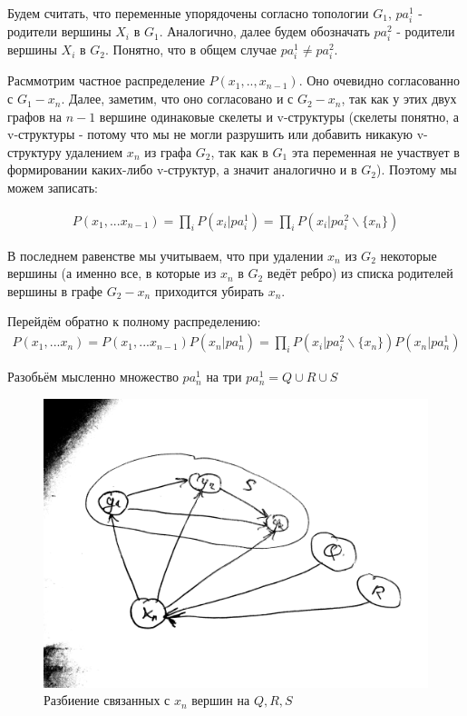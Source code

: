 \documentclass[fleqn]{article}
\begin{document}
Будем считать, что переменные упорядочены согласно топологии $G_1$, $pa^1_i$ - родители вершины $X_i$ в $G_1$. Аналогично, далее будем обозначать $pa^2_i$ - родители вершины $X_i$ в $G_2$. Понятно, что в общем случае $pa^1_i \neq pa^2_i$. 

Расммотрим частное распределение  $P(x_1,..,x_{n-1})$. Оно  очевидно согласованно с $G_1-x_n$. Далее, заметим, что оно согласовано и с $G_2-x_n$, так как у этих двух графов на $n-1$ вершине одинаковые скелеты и v-структуры (скелеты понятно, а v-структуры - потому что мы не могли разрушить или добавить никакую v-структуру удалением $x_n$ из графа $G_2$, так как в $G_1$ эта переменная не участвует в формировании каких-либо v-структур, а значит аналогично и в $G_2$). Поэтому мы можем записать:

\begin{align}
	P(x_1,...x_{n-1}) = \prod\limits_{i}P(x_i|pa^1_{i}) = \prod\limits_{i}P(x_i|pa^2_{i} \backslash \{x_n\}) 
\end{align}

В последнем равенстве мы учитываем, что при удалении $x_n$ из $G_2$ некоторые вершины (а именно все, в которые из $x_n$ в $G_2$ ведёт ребро) из списка родителей вершины в графе $G_2-x_n$ приходится убирать $x_n$.

Перейдём обратно к полному распределению: 
\begin{align}
	P(x_1,...x_{n}) = P(x_1,...x_{n-1})P(x_n|pa^1_{n}) = \prod\limits_{i}P(x_i|pa^2_{i} \backslash \{x_n\}) P(x_n|pa^1_{n})
\end{align}

Разобьём мысленно множество $pa^1_n$ на три $pa^1_n = Q \cup R \cup S$

\begin{figure}[h]
	\begin{center}
		\includegraphics[scale=0.05]{imgs/img11.png}
	\end{center}
	\caption{Разбиение связанных с $x_n$ вершин на $Q,R,S$}
	\label{fig:equiv2}
\end{figure}
\end{document}
